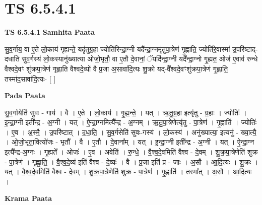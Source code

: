 \documentclass[17pt]{extarticle}
\begin{document}
\section{ TS 6.5.4.1 }

\textbf{TS 6.5.4.1 } \newline
\textbf{Samhita Paata} \newline

सु॒व॒र्गाय॒ वा ए॒ते लो॒काय॑ गृह्यन्ते॒ यदृ॑तुग्र॒हा ज्योति॑रिन्द्रा॒ग्नी यदै᳚न्द्रा॒ग्नमृ॑तुपा॒त्रेण॑ गृ॒ह्णाति॒ ज्योति॑रे॒वास्मा॑ उ॒परि॑ष्टाद्-दधाति सुव॒र्गस्य॑ लो॒कस्यानु॑ख्यात्या ओजो॒भृतौ॒ वा ए॒तौ दे॒वानां॒ ॅयदि॑न्द्रा॒ग्नी यदै᳚न्द्रा॒ग्नो गृ॒ह्यत॒ ओज॑ ए॒वाव॑ रुन्धे वैश्वदे॒वꣳ शु॑क्रपा॒त्रेण॑ गृह्णाति वैश्वदे॒व्यो॑ वै प्र॒जा अ॒सावा॑दि॒त्यः शु॒क्रो यद्-वै᳚श्वदे॒वꣳशु॑क्रपा॒त्रेण॑ गृ॒ह्णाति॒ तस्मा॑द॒सावा॑दि॒त्यः- [  ] \newline

\textbf{Pada Paata} \newline

सु॒व॒र्गायेति॑ सुवः - गाय॑ । वै । ए॒ते । लो॒काय॑ । गृ॒ह्य॒न्ते॒ । यत् । ऋ॒तु॒ग्र॒हा इत्यृ॑तु - ग्र॒हाः । ज्योतिः॑ । इ॒न्द्रा॒ग्नी इती᳚न्द्र - अ॒ग्नी । यत् । ऐ॒न्द्रा॒ग्नमित्यै᳚न्द्र - अ॒ग्नम् । ऋ॒तु॒पा॒त्रेणेत्यृ॑तु - पा॒त्रेण॑ । गृ॒ह्णाति॑ । ज्योतिः॑ । ए॒व । अ॒स्मै॒ । उ॒परि॑ष्टात् । द॒धा॒ति॒ । सु॒व॒र्गसेति॑ सुवः-गस्य॑ । लो॒कस्य॑ । अनु॑ख्यात्या॒ इत्यनु॑ - ख्या॒त्यै॒ । ओ॒जो॒भृता॒वित्यो॑जः - भृतौ᳚ । वै । ए॒तौ । दे॒वाना᳚म् । यत् । इ॒न्द्रा॒ग्नी इती᳚न्द्र - अ॒ग्नी । यत् । ऐ॒न्द्रा॒ग्न इत्यै᳚न्द्र-अ॒ग्नः । गृ॒ह्यते᳚ । ओजः॑ । ए॒व । अवेति॑ । रु॒न्धे॒ । वै॒श्व॒दे॒वमिति॑ वैश्व - दे॒वम् । शु॒क्र॒पा॒त्रेणेति॑ शुक्र - पा॒त्रेण॑ । गृ॒ह्णा॒ति॒ । वै॒श्व॒दे॒व्य॑ इति॑ वैश्व - दे॒व्यः॑ । वै । प्र॒जा इति॑ प्र - जाः । अ॒सौ । आ॒दि॒त्यः । शु॒क्रः । यत् । वै॒श्व॒दे॒वमिति॑ वैश्व - दे॒वम् । शु॒क्र॒पा॒त्रेणेति॑ शुक्र - पा॒त्रेण॑ । गृ॒ह्णाति॑ । तस्मा᳚त् । अ॒सौ । आ॒दि॒त्यः ।  \newline


\textbf{Krama Paata} \newline
\end{document}
